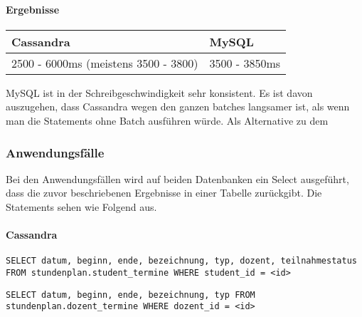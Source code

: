 \paragraph{Ergebnisse}
\begin{tabular}{|p{6cm}|p{6cm}|}
	\hline
	\textbf{Cassandra} & \textbf{MySQL}\\
	\hline
	2500 - 6000ms (meistens 3500 - 3800) & 3500 - 3850ms\\
	\hline
\end{tabular}

\vspace{6pt}

MySQL ist in der Schreibgeschwindigkeit sehr konsistent. Es ist davon auszugehen, dass Cassandra wegen den ganzen batches langsamer ist, als wenn man die Statements ohne Batch ausführen würde. Als Alternative zu dem 

\newpage

\subsubsection{Anwendungsfälle}
Bei den Anwendungsfällen wird auf beiden Datenbanken ein Select ausgeführt, dass die zuvor beschriebenen Ergebnisse in einer Tabelle zurückgibt. Die Statements sehen wie Folgend aus.

\vspace{6pt}

\paragraph{Cassandra}
\begin{lstlisting}
SELECT datum, beginn, ende, bezeichnung, typ, dozent, teilnahmestatus FROM stundenplan.student_termine WHERE student_id = <id>
\end{lstlisting} 
\begin{lstlisting}
SELECT datum, beginn, ende, bezeichnung, typ FROM stundenplan.dozent_termine WHERE dozent_id = <id>
\end{lstlisting} 

\vspace{6pt}

